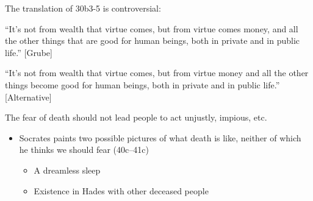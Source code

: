 \documentclass[11pt]{article}
\begin{document}
\noindent The translation of 30b3-5 is controversial:
\vspace*{1mm}

\noindent ``It's not from wealth that virtue comes, but from virtue comes money, and all the other things that are good for human beings, both in private and in public life.'' [Grube]
\vspace*{2mm}

\noindent ``It's not from wealth that virtue comes, but from virtue money and all the other things become good for human beings, both in private and in public life.'' [Alternative]
\vspace*{2mm}

\noindent The fear of death should not lead people to act unjustly, impious, etc.

\begin{itemize}\item{Socrates paints two possible pictures of what death is like, neither of which he thinks we should fear (40c--41c)}\begin{itemize}\item{A dreamless sleep}\item{Existence in Hades with other deceased people}\end{itemize}\end{itemize}
\end{document}
